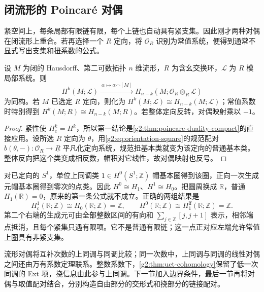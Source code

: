 \subsection{闭流形的 Poincaré 对偶}
\label{g2:subsec:0603:04}
紧空间上，每条局部有限链有限，每个上链也自动具有紧支集。因此刚才两种对偶在闭流形上重合。若再选择一个 \(R\) 定向，将 \(\mathcal O_R\) 识别为常值系统，便得到通常不显式写出支集和扭系数的公式。

\begin{corollary}\label{g2:cor:closed-poincare-duality}
	设 \(M\) 为闭的 Hausdorff、第二可数拓扑 \(n\) 维流形，\(R\) 为含幺交换环，\(\mathcal L\) 为 \(R\) 模局部系统。则
	\[
		H^k(M;\mathcal L)\xrightarrow{\ \alpha\mapsto\alpha\frown[M]\ }
		H_{n-k}(M;\mathcal O_R\otimes_R\mathcal L)
	\]
	为同构。若 \(M\) 已选定 \(R\) 定向，则化为 \(H^k(M;\mathcal L)\cong H_{n-k}(M;\mathcal L)\)；常值系数时特别得到 \(H^k(M;R)\cong H_{n-k}(M;R)\)。若整体定向反转，对偶映射乘以 \(-1\)。
\end{corollary}
\begin{proof}
	紧性使 \(H_c^k=H^k\)，所以第一结论是\cref{g2:thm:poincare-duality-compact}的直接应用。设所选 \(R\) 定向为 \(\theta\)，用\cref{g2:eq:orientation-square}的规范配对 \(b(\theta,-)\colon\mathcal O_R\to\underline R\) 平凡化定向系统，规范扭基本类就变为该定向的普通基本类。整体反向把这个类变成相反数，帽积对它线性，故对偶映射也反号。
\end{proof}

\begin{example}\label{g2:exm:duality-line-circle}
	对已定向的 \(S^1\)，单位上同调类 \(1\in H^0(S^1;\mathbb Z)\) 帽基本圈得到该圈，正向一次生成元帽基本圈得到零次的点类。因此 \(H^0\cong H_1\)、\(H^1\cong H_0\)。把圆周换成 \(\mathbb R\)，普通 \(H_1(\mathbb R)=0\)，原来的第一条公式就不成立。正确的两组结果是
	\[
		H_c^1(\mathbb R;\mathbb Z)\cong H_0(\mathbb R;\mathbb Z)=\mathbb Z,
		\qquad H^0(\mathbb R;\mathbb Z)\cong H_1^{\mathrm{lf}}(\mathbb R;\mathbb Z)=\mathbb Z.
	\]
	第二个右端的生成元可由全部整数区间的有向和 \(\sum_{j\in\mathbb Z}[j,j+1]\) 表示，相邻端点抵消，且每个紧集只遇有限项。它不是普通有限链；这一点正对应左端允许常值上圈具有非紧支集。
\end{example}

流形对偶将互补次数的上同调与同调比较；同一次数中，上同调与同调的线性对偶之间还由万有系数定理联系。整数系数下，\cref{g2:thm:uct-cohomology}保留了低一次同调的 Ext 项，挠信息由此参与上同调。下一节加入边界条件，最后一节再将对偶与取值配对结合，分别构造自由部分的交形式和挠部分的链接配对。
